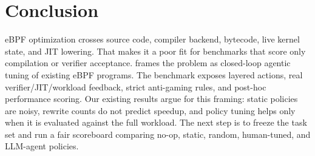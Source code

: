 \section{Conclusion}
\label{sec:conclusion}

eBPF optimization crosses source code, compiler backend, bytecode, live kernel state, and JIT lowering. That makes it a poor fit for benchmarks that score only compilation or verifier acceptance. \sys frames the problem as closed-loop agentic tuning of existing eBPF programs. The benchmark exposes layered actions, real verifier/JIT/workload feedback, strict anti-gaming rules, and post-hoc performance scoring. Our existing results argue for this framing: static policies are noisy, rewrite counts do not predict speedup, and policy tuning helps only when it is evaluated against the full workload. The next step is to freeze the task set and run a fair scoreboard comparing no-op, static, random, human-tuned, and LLM-agent policies.
